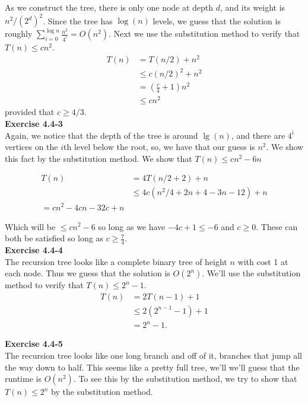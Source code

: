 \documentclass{article}
\begin{document}
As we construct the tree, there is only one node at depth $d$, and its weight is $n^2/(2^d)^2$.  Since the tree has $\log(n)$ levels, we guess that the solution is roughly $\sum_{i=0}^{\log n} \frac{n^2}{4^i} = O(n^2)$.  Next we use the substitution method to verify that $T(n) \leq cn^2$.  
\begin{align*}
T(n) &= T(n/2) + n^2 \\
& \leq c(n/2)^2 + n^2 \\
& = (\frac{c}{4} + 1)n^2 \\
&\leq cn^2
\end{align*}
provided that $c \geq 4/3$.  \\

\noindent\textbf{Exercise 4.4-3}\\

Again, we notice that the depth of the tree is around $\lg(n)$, and there are $4^i$ vertices on the $i$th level below the root, so, we have that our guess is $n^2$. We show this fact by the substitution method. We show that $T(n) \le cn^2 -6n$

\begin{align*}
T(n)  &=4T(n/2+2)+n\\
&\le4c(n^2/4 + 2n + 4 - 3n-12) + n\\
=cn^2 - 4cn-32c + n
\end{align*}

Which will be $\le cn^2-6$ so long as we have $-4c+1 \le -6$ and $c\ge0$. These can both be satisfied so long as $c\ge \frac{7}{4}$.\\

\noindent\textbf{Exercise 4.4-4}\\

The recursion tree looks like a complete binary tree of height $n$ with cost 1 at each node.  Thus we guess that the solution is $O(2^n)$.  We'll use the substitution method to verify that $T(n) \leq 2^n - 1$. 
\begin{align*}
T(n) &= 2T(n-1) + 1 \\
&\leq 2(2^{n-1} - 1) + 1 \\
&= 2^n - 1.
\end{align*}

\noindent\textbf{Exercise 4.4-5}\\

The recursion tree looks like one long branch and off of it, branches that jump all the way down to half. This seems like a pretty full tree, we'll we'll guess that the runtime is $O(n^2)$. To see this by the substitution method, we try to show that $T(n)\le 2^n$ by the substitution method.
\end{document}
